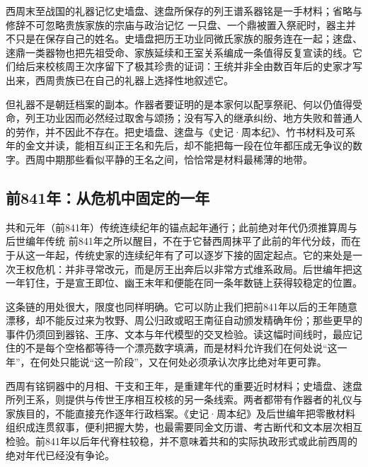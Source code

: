 \begin{event}{西周末至战国的礼器记忆}{史墙盘、逨盘所保存的列王谱系}{器铭是一手材料；省略与修辞不可忽略}{贵族家族的宗庙与政治记忆}
一只盘、一个鼎被置入祭祀时，器主并不只是在保存自己的姓名。史墙盘把历王功业同微氏家族的服务连在一起；逨盘、逨鼎一类器物也把先祖受命、家族延续和王室关系编成一条值得反复宣读的线。它们给后来校核周王次序留下了极其珍贵的证词：王统并非全由数百年后的史家才写出来，西周贵族已在自己的礼器上选择性地叙述它。

但礼器不是朝廷档案的副本。作器者要证明的是本家何以配享祭祀、何以仍值得受命，列王功业因而必然经过取舍与颂扬；没有写入的继承纠纷、地方失败和普通人的劳作，并不因此不存在。把史墙盘、逨盘与《史记·周本纪》、竹书材料及可系年的金文并读，能相互纠正王名和先后，却不能把每一段在位年都压成无争议的数字。西周中期那些看似平静的王名之间，恰恰常是材料最稀薄的地带。
\end{event}

\subsection{前841年：从危机中固定的一年}

\begin{event}{共和元年（前841年）}{传统连续纪年的锚点}{起年通行；此前绝对年代仍须推算}{周与后世编年传统}
前841年之所以醒目，不在于它替西周抹平了此前的年代分歧，而在于从这一年起，传统史家的连续纪年有了可以逐岁下接的固定起点。它的来处是一次王权危机：并非寻常改元，而是厉王出奔后以非常方式维系政局。后世编年把这一年钉住，于是宣王即位、幽王末年和便能在同一条年数链上获得较稳定的位置。

这条链的用处很大，限度也同样明确。它可以防止我们把前841年以后的王年随意漂移，却不能反过来为牧野、周公归政或昭王南征自动颁发精确年份；那些更早的事件仍须回到器铭、王序、文本与年代模型的交叉检验。读这幅时间线时，最应记住的不是每个空格都等待一个漂亮数字填满，而是材料允许我们在何处说“这一年”，在何处只能说“这一阶段”，又在何处必须承认次序比绝对年更可靠。
\end{event}

\begin{sourcenote}[日期、王序与后出叙事]
西周有铭铜器中的月相、干支和王年，是重建年代的重要近时材料；史墙盘、逨盘所列王系，则提供与传世王序相互校核的另一条线索。两者都带有作器者的礼仪与家族目的，不能直接充作逐年行政档案。《史记·周本纪》及后世编年把零散材料组织成连贯叙事，便利把握大势，也最需要同金文历谱、考古断代和文本层次相互检验。前841年以后年代脊柱较稳，并不意味着共和的实际执政形式或此前西周的绝对年代已经没有争论。
\end{sourcenote}
